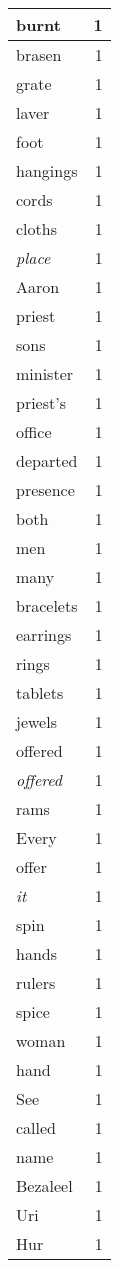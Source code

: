 \begin{center}
\begin{longtable}{l|r}
burnt & 1 \\ \hline
brasen & 1 \\ \hline
grate & 1 \\ \hline
laver & 1 \\ \hline
foot & 1 \\ \hline
hangings & 1 \\ \hline
cords & 1 \\ \hline
cloths & 1 \\ \hline
\emph{place} & 1 \\ \hline
Aaron & 1 \\ \hline
priest & 1 \\ \hline
sons & 1 \\ \hline
minister & 1 \\ \hline
priest's & 1 \\ \hline
office & 1 \\ \hline
departed & 1 \\ \hline
presence & 1 \\ \hline
both & 1 \\ \hline
men & 1 \\ \hline
many & 1 \\ \hline
bracelets & 1 \\ \hline
earrings & 1 \\ \hline
rings & 1 \\ \hline
tablets & 1 \\ \hline
jewels & 1 \\ \hline
offered & 1 \\ \hline
\emph{offered} & 1 \\ \hline
rams & 1 \\ \hline
Every & 1 \\ \hline
offer & 1 \\ \hline
\emph{it} & 1 \\ \hline
spin & 1 \\ \hline
hands & 1 \\ \hline
rulers & 1 \\ \hline
spice & 1 \\ \hline
woman & 1 \\ \hline
hand & 1 \\ \hline
See & 1 \\ \hline
called & 1 \\ \hline
name & 1 \\ \hline
Bezaleel & 1 \\ \hline
Uri & 1 \\ \hline
Hur & 1 \\ \hline

\end{longtable}
\end{center}
